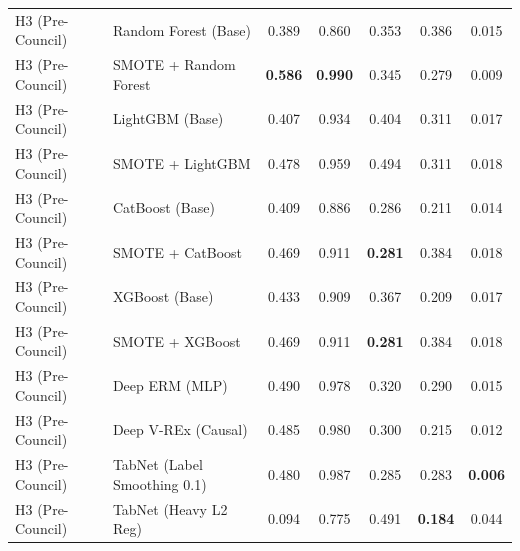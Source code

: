 \begin{table}[htbp]
{\begin{tabular}{llccccc}
H3 (Pre-Council) & Random Forest (Base) & 0.389 & 0.860 & 0.353 & 0.386 & 0.015 \\
H3 (Pre-Council) & SMOTE + Random Forest & \textbf{0.586} & \textbf{0.990} & 0.345 & 0.279 & 0.009 \\
H3 (Pre-Council) & LightGBM (Base) & 0.407 & 0.934 & 0.404 & 0.311 & 0.017 \\
H3 (Pre-Council) & SMOTE + LightGBM & 0.478 & 0.959 & 0.494 & 0.311 & 0.018 \\
H3 (Pre-Council) & CatBoost (Base) & 0.409 & 0.886 & 0.286 & 0.211 & 0.014 \\
H3 (Pre-Council) & SMOTE + CatBoost & 0.469 & 0.911 & \textbf{0.281} & 0.384 & 0.018 \\
H3 (Pre-Council) & XGBoost (Base) & 0.433 & 0.909 & 0.367 & 0.209 & 0.017 \\
H3 (Pre-Council) & SMOTE + XGBoost & 0.469 & 0.911 & \textbf{0.281} & 0.384 & 0.018 \\
H3 (Pre-Council) & Deep ERM (MLP) & 0.490 & 0.978 & 0.320 & 0.290 & 0.015 \\
H3 (Pre-Council) & Deep V-REx (Causal) & 0.485 & 0.980 & 0.300 & 0.215 & 0.012 \\
H3 (Pre-Council) & TabNet (Label Smoothing 0.1) & 0.480 & 0.987 & 0.285 & 0.283 & \textbf{0.006} \\
H3 (Pre-Council) & TabNet (Heavy L2 Reg) & 0.094 & 0.775 & 0.491 & \textbf{0.184} & 0.044 \\
\bottomrule
\end{tabular}%
}
\end{table}
